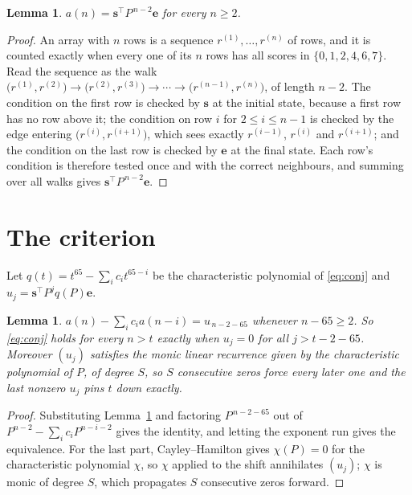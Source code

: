 \documentclass[11pt,a4paper]{article}
\theoremstyle{plain}
\newtheorem{lemma}[theorem]{Lemma}
\theoremstyle{definition}
\begin{document}
\begin{lemma}\label{lem:walk}
$a(n)=\mathbf{s}^{\!\top}P^{\,n-2}\mathbf{e}$ for every $n\ge2$.
\end{lemma}

\begin{proof}
An array with $n$ rows is a sequence $r^{(1)},\dots,r^{(n)}$ of rows, and it is counted
exactly when every one of its $n$ rows has all scores in $\{0,1,2,4,6,7\}$. Read the sequence as the
walk $\bigl(r^{(1)},r^{(2)}\bigr)\to\bigl(r^{(2)},r^{(3)}\bigr)\to\cdots\to
\bigl(r^{(n-1)},r^{(n)}\bigr)$, of length $n-2$. The condition on the first row is
checked by $\mathbf{s}$ at the initial state, because a first row has no row above it; the
condition on row $i$ for $2\le i\le n-1$ is checked by the edge entering
$\bigl(r^{(i)},r^{(i+1)}\bigr)$, which sees exactly $r^{(i-1)}$, $r^{(i)}$ and
$r^{(i+1)}$; and the condition on the last row is checked by $\mathbf{e}$ at the final
state. Each row's condition is therefore tested once and with the correct neighbours, and
summing over all walks gives $\mathbf{s}^{\!\top}P^{\,n-2}\mathbf{e}$.
\end{proof}

\section{The criterion}

Let $q(t)=t^{65}-\sum_i c_i t^{65-i}$ be the characteristic polynomial of
\eqref{eq:conj} and $u_j=\mathbf{s}^{\!\top}P^{j}q(P)\mathbf{e}$.

\begin{lemma}\label{lem:crit}
$a(n)-\sum_i c_i a(n-i)=u_{\,n-2-65}$ whenever $n-65\ge2$. So \eqref{eq:conj}
holds for every $n>t$ exactly when $u_j=0$ for all $j>t-2-65$. Moreover $(u_j)$
satisfies the monic linear recurrence given by the characteristic polynomial of $P$, of
degree $S$, so $S$ consecutive zeros force every later one and the last nonzero $u_j$ pins
$t$ down exactly.
\end{lemma}

\begin{proof}
Substituting Lemma~\ref{lem:walk} and factoring $P^{\,n-2-65}$ out of
$P^{n-2}-\sum_i c_i P^{n-i-2}$ gives the identity, and letting the exponent run gives the
equivalence. For the last part, Cayley--Hamilton gives $\chi(P)=0$ for the characteristic
polynomial $\chi$, so $\chi$ applied to the shift annihilates $(u_j)$; $\chi$ is monic of
degree $S$, which propagates $S$ consecutive zeros forward.
\end{proof}
\end{document}

